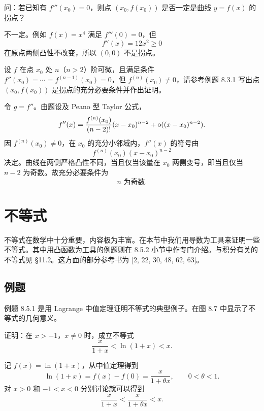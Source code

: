 \begin{xexercise}[19]
问：若已知有 $f'''(x_0)=0$，则点 $(x_0,f(x_0))$ 是否一定是曲线 $y=f(x)$ 的拐点？
\end{xexercise}
\begin{xsolution}
不一定。例如 $f(x)=x^4$ 满足 $f'''(0)=0$，但
\[
  f''(x)=12x^2\ge0
\]
在原点两侧凸性不改变，所以 $(0,0)$ 不是拐点。
\end{xsolution}


\begin{xexercise}[20]
设 $f$ 在点 $x_0$ 处 $n$（$n>2$）阶可微，且满足条件 $f''(x_0)=\cdots=f^{(n-1)}(x_0)=0$，但 $f^{(n)}(x_0)\ne0$，请参考例题 8.3.1 写出点 $(x_0,f(x_0))$ 是拐点的充分必要条件并作出证明。
\end{xexercise}
\begin{xsolution}
令 $g=f''$。由题设及 Peano 型 Taylor 公式，
\[
  f''(x)
  =\frac{f^{(n)}(x_0)}{(n-2)!}(x-x_0)^{n-2}
   +\mathrm{o}((x-x_0)^{n-2}).
\]
因 $f^{(n)}(x_0)\ne0$，在 $x_0$ 的充分小邻域内，$f''(x)$ 的符号由
\[
  f^{(n)}(x_0)(x-x_0)^{n-2}
\]
决定。曲线在两侧严格凸性不同，当且仅当该量在 $x_0$ 两侧变号，即当且仅当 $n-2$ 为奇数。故充分必要条件为
\[
  \boxed{n\text{ 为奇数}}.
\]
\end{xsolution}


\section{不等式}

不等式在数学中十分重要，内容极为丰富。在本节中我们用导数为工具来证明一些不等式。其中用凸函数为工具的例题则在 8.5.2 小节中作专门介绍。与积分有关的不等式见 §11.2。这方面的部分参考书为 [2, 22, 30, 48, 62, 63]。

\subsection{例题}

例题 8.5.1 是用 Lagrange 中值定理证明不等式的典型例子。在图 8.7 中显示了不等式的几何意义。

\begin{xexample}[8.5.1]
证明：在 $x>-1$，$x\ne0$ 时，成立不等式
\[
  \frac{x}{1+x}<\ln(1+x)<x.
\]
\end{xexample}
\begin{xproof}
记 $f(x)=\ln(1+x)$，从中值定理得到
\[
  \ln(1+x)=f(x)-f(0)=\frac{x}{1+\theta x},\qquad0<\theta<1.
\]
对 $x>0$ 和 $-1<x<0$ 分别讨论就可以得到
\[
  \frac{x}{1+x}<\frac{x}{1+\theta x}<x.
\]
\end{xproof}


